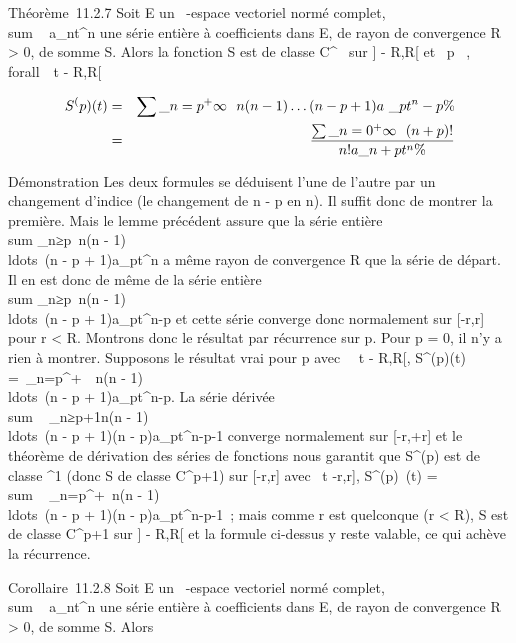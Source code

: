 \documentclass[]{article}
\begin{document}
Théorème~11.2.7 Soit E un ~-espace vectoriel normé complet,
\\sum ~
a\_nt^n une série entière à coefficients dans E, de
rayon de convergence R \textgreater{} 0, de somme S. Alors la fonction S
est de classe C^\infty~ sur {]} - R,R{[} et
\forall~p \in {}~, \\forall~~t \in{]} -
R,R{[}

\begin{align*} S^(p)(t)& =&
\sum \_n=p^+\infty~~n(n -
1)\ldots(n - p + 1)a~\_
pt^n-p\%& \\ & =&
\sum \_n=0^+\infty~~ (n + p)!
\over n! a\_n+pt^n \%&
\\ \end{align*}

Démonstration Les deux formules se déduisent l'une de l'autre par un
changement d'indice (le changement de n - p en n). Il suffit donc de
montrer la première. Mais le lemme précédent assure que la série entière
\\sum  \_n≥p~n(n
- 1)\\ldots~(n - p +
1)a\_pt^n a même rayon de convergence R que la série
de départ. Il en est donc de même de la série entière
\\sum  \_n≥p~n(n
- 1)\\ldots~(n - p +
1)a\_pt^n-p et cette série converge donc normalement
sur {[}-r,r{]} pour r \textless{} R. Montrons donc le résultat par
récurrence sur p. Pour p = 0, il n'y a rien à montrer. Supposons le
résultat vrai pour p avec \forall~~t \in{]} - R,R{[},
S^(p)(t) =\
\sum  \_n=p^+\infty~~n(n -
1)\\ldots~(n - p +
1)a\_pt^n-p. La série dérivée
\\sum ~
\_n≥p+1n(n -
1)\\ldots~(n - p +
1)(n - p)a\_pt^n-p-1 converge normalement sur
{[}-r,+r{]} et le théorème de dérivation des séries de fonctions nous
garantit que S^(p) est de classe \mathcal{C}^1 (donc S de
classe C^p+1) sur {[}-r,r{]} avec
\forall~t \in {[}-r,r{]}, S^(p)~(t)
= \\sum ~
\_n=p^+\infty~n(n -
1)\\ldots~(n - p +
1)(n - p)a\_pt^n-p-1~; mais comme r est quelconque (r
\textless{} R), S est de classe C^p+1 sur {]} - R,R{[} et la
formule ci-dessus y reste valable, ce qui achève la récurrence.

Corollaire~11.2.8 Soit E un ~-espace vectoriel normé complet,
\\sum ~
a\_nt^n une série entière à coefficients dans E, de
rayon de convergence R \textgreater{} 0, de somme S. Alors
\end{document}

